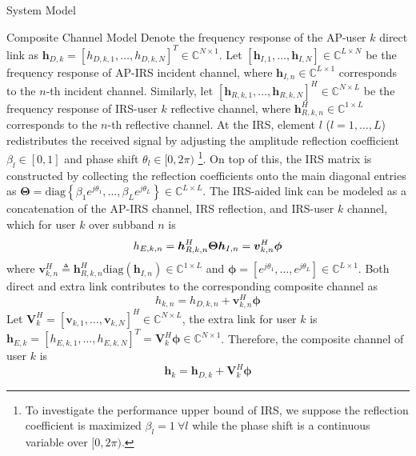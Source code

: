 \documentclass{IEEEtran}
\begin{document}
\begin{section}{System Model}
	\begin{subsection}{Composite Channel Model}
		Denote the frequency response of the AP-user $k$ direct link as $\boldsymbol{h}_{D,k}=[h_{D,k,1},\dots,h_{D,k,N}]^T \in \mathbb{C}^{N \times 1}$. Let $[\boldsymbol{h}_{I,1},\dots,\boldsymbol{h}_{I,N}] \in \mathbb{C}^{L \times N}$ be the frequency response of AP-IRS incident channel, where $\boldsymbol{h}_{I,n} \in \mathbb{C}^{L \times 1}$ corresponds to the $n$-th incident channel. Similarly, let $[\boldsymbol{h}_{R,k,1},\dots,\boldsymbol{h}_{R,k,N}]^H \in \mathbb{C}^{N \times L}$ be the frequency response of IRS-user $k$ reflective channel, where $\boldsymbol{h}_{R,k,n}^H \in \mathbb{C}^{1 \times L}$ corresponds to the $n$-th reflective channel. At the IRS, element $l$ ($l=1,\dots,L$) redistributes the received signal by adjusting the amplitude reflection coefficient $\beta_l \in [0,1]$ and phase shift $\theta_l \in [0,2\pi)$ \footnote{To investigate the performance upper bound of IRS, we suppose the reflection coefficient is maximized $\beta_l=1 \ \forall l$ while the phase shift is a continuous variable over $[0,2\pi)$.}. On top of this, the IRS matrix is constructed by collecting the reflection coefficients onto the main diagonal entries as $\boldsymbol{\Theta} = \mathrm{diag}\left\{\beta_1 e^{j \theta_1}, \dots, \beta_L e^{j \theta_L}\right\} \in \mathbb{C}^{L \times L}$. The IRS-aided link can be modeled as a concatenation of the AP-IRS channel, IRS reflection, and IRS-user $k$ channel, which for user $k$ over subband $n$ is
		\begin{equation}\label{eq:h_{E,k,n}}
			h_{E,k,n} = \boldsymbol{h}_{R,k,n}^H \boldsymbol{\Theta} \boldsymbol{h}_{I,n} = \boldsymbol{v}_{k,n}^H \boldsymbol{\phi}
		\end{equation}
		where $\boldsymbol{v}_{k,n}^H \triangleq \boldsymbol{h}_{R,k,n}^H \mathrm{diag}(\boldsymbol{h}_{I,n}) \in \mathbb{C}^{1 \times L}$ and $\boldsymbol{\phi}=[e^{j{\theta_1}},\dots,e^{j{\theta_L}}] \in \mathbb{C}^{L \times 1}$. Both direct and extra link contributes to the corresponding composite channel as
		\begin{equation}
			h_{k,n} = h_{D,k,n} + \boldsymbol{v}_{k,n}^H \boldsymbol{\phi}
		\end{equation}
		Let $\boldsymbol{V}_k^H=[\boldsymbol{v}_{k,1},\dots,\boldsymbol{v}_{k,N}]^H \in \mathbb{C}^{N \times L}$, the extra link for user $k$ is $\boldsymbol{h}_{E,k}=[h_{E,k,1},\dots,h_{E,k,N}]^T=\boldsymbol{V}_k^H \boldsymbol{\phi} \in \mathbb{C}^{N \times 1}$. Therefore, the composite channel of user $k$ is
		\begin{equation}\label{eq:h_k}
			\boldsymbol{h}_k = \boldsymbol{h}_{D,k} + \boldsymbol{V}_k^H \boldsymbol{\phi}
		\end{equation}
	\end{subsection}


\end{section}
\end{document}
